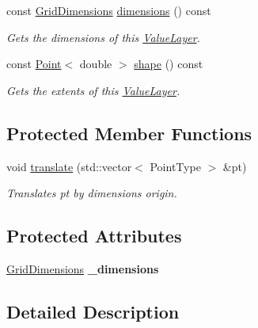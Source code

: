\begin{DoxyCompactItemize}
const \hyperlink{classrepast_1_1_grid_dimensions}{Grid\-Dimensions} \hyperlink{classrepast_1_1_value_layer_a51fe7fe718305d0c006bc465a14ef0e3}{dimensions} () const 
\begin{DoxyCompactList}\small\item\em Gets the dimensions of this \hyperlink{classrepast_1_1_value_layer}{Value\-Layer}. \end{DoxyCompactList}\item 
const \hyperlink{classrepast_1_1_point}{Point}$<$ double $>$ \hyperlink{classrepast_1_1_value_layer_a7d40855a19798af51b4523136c43e3bf}{shape} () const 
\begin{DoxyCompactList}\small\item\em Gets the extents of this \hyperlink{classrepast_1_1_value_layer}{Value\-Layer}. \end{DoxyCompactList}\end{DoxyCompactItemize}
\subsection*{Protected Member Functions}
\begin{DoxyCompactItemize}
\item 
\hypertarget{classrepast_1_1_value_layer_ac1f75aa259d123bcd2dd5e8bd1630b14}{void \hyperlink{classrepast_1_1_value_layer_ac1f75aa259d123bcd2dd5e8bd1630b14}{translate} (std\-::vector$<$ Point\-Type $>$ \&pt)}\label{classrepast_1_1_value_layer_ac1f75aa259d123bcd2dd5e8bd1630b14}

\begin{DoxyCompactList}\small\item\em Translates pt by dimensions origin. \end{DoxyCompactList}\end{DoxyCompactItemize}
\subsection*{Protected Attributes}
\begin{DoxyCompactItemize}
\item 
\hypertarget{classrepast_1_1_value_layer_a113ad617c865632143a16685faa9de7c}{\hyperlink{classrepast_1_1_grid_dimensions}{Grid\-Dimensions} {\bfseries \-\_\-dimensions}}\label{classrepast_1_1_value_layer_a113ad617c865632143a16685faa9de7c}

\end{DoxyCompactItemize}


\subsection{Detailed Description}

